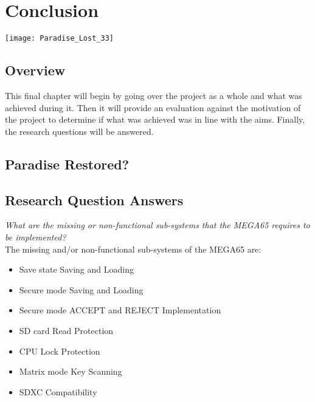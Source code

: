 
\chapter{Conclusion} %

\texttt{[image: Paradise\_Lost\_33]}

\label{Chapter 8} %

\section{Overview}

This final chapter will begin by going over the project as a whole and what was achieved during it. Then it will provide an evaluation against the motivation of the project to determine if what was achieved was in line with the aims. Finally, the research questions will be answered.


\section{Paradise Restored?}

\label{Ch8 Sec1}




\section{Research Question Answers}

\label{Ch9 Sec2}

\textit{What are the missing or non-functional sub-systems that the MEGA65 requires to be implemented?}\\
The missing and/or non-functional sub-systems of the MEGA65 are:
\begin{itemize}
\item{Save state Saving and Loading}
\item{Secure mode Saving and Loading}
\item{Secure mode ACCEPT and REJECT Implementation}
\item{SD card Read Protection}
\item{CPU Lock Protection}
\item{Matrix mode Key Scanning}
\item{SDXC Compatibility}
\end{itemize}

